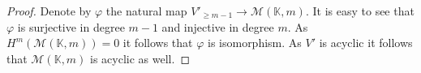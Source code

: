 \documentclass[12pt]{extarticle}
\def\mb{\mathbb}
\def\mc{\mathcal}
\def\L{\Lambda}
\def\k{\mb K}
\def\Z{\mb Z}
\def\Q{\mb Q}
\def\t{\times}
\renewcommand{\P}{{\mb P}}
\def\bs{\backslash}
\def \M{\mc M}
\DeclareMathOperator{\im}{Im}
\DeclareMathOperator{\spec}{Spec}
\begin{document}
\begin{proof}
    Denote by $\varphi$ the natural map $V'_{\geq m-1}\to \M(\k,m)$. It is easy to see that $\varphi$ is surjective in degree $m-1$ and injective in degree $m$. As $H^m(\M(\k,m))=0$ it follows that $\varphi$ is isomorphism. As $V'$ is acyclic it follows that $\M(\k,m)$ is acyclic as well.
\end{proof}



   
    


\end{document}
